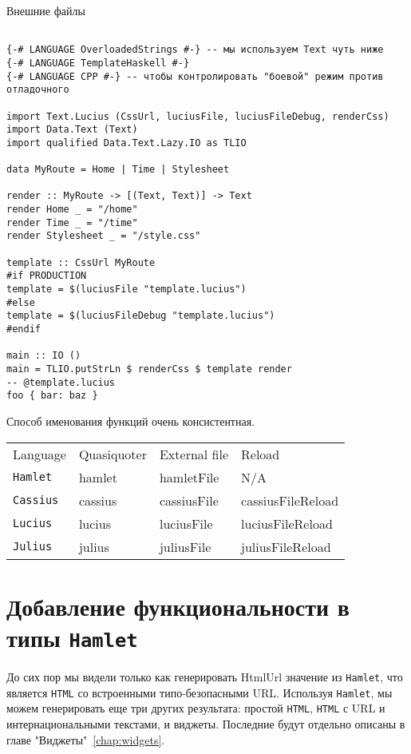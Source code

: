 Внешние файлы
\begin{lstlisting}

{-# LANGUAGE OverloadedStrings #-} -- мы используем Text чуть ниже
{-# LANGUAGE TemplateHaskell #-}
{-# LANGUAGE CPP #-} -- чтобы контролировать "боевой" режим против отладочного

import Text.Lucius (CssUrl, luciusFile, luciusFileDebug, renderCss)
import Data.Text (Text)
import qualified Data.Text.Lazy.IO as TLIO

data MyRoute = Home | Time | Stylesheet

render :: MyRoute -> [(Text, Text)] -> Text
render Home _ = "/home"
render Time _ = "/time"
render Stylesheet _ = "/style.css"

template :: CssUrl MyRoute
#if PRODUCTION
template = $(luciusFile "template.lucius")
#else
template = $(luciusFileDebug "template.lucius")
#endif

main :: IO ()
main = TLIO.putStrLn $ renderCss $ template render
-- @template.lucius
foo { bar: baz }
\end{lstlisting}

Способ именования функций очень консистентная.
\begin{tabular}{l l l l}
Language & Quasiquoter & External file & Reload \\
\texttt{Hamlet}   & hamlet      & hamletFile    & N/A    \\
\texttt{Cassius}  & cassius     & cassiusFile   & cassiusFileReload \\
\texttt{Lucius}   & lucius      & luciusFile    & luciusFileReload \\
\texttt{Julius}   & julius      & juliusFile    & juliusFileReload \\
\end{tabular}

\section{Добавление функциональности в типы \texttt{Hamlet}}
До сих пор мы видели только как генерировать HtmlUrl значение из \texttt{Hamlet}, что 
является \texttt{HTML} со встроенными типо-безопасными URL. Используя \texttt{Hamlet}, 
мы можем генерировать еще три других результата: простой \texttt{HTML}, \texttt{HTML} с URL и 
интернациональными текстами, и виджеты.
Последние будут отдельно описаны в главе "Виджеты"~\ref{chap:widgets}.

